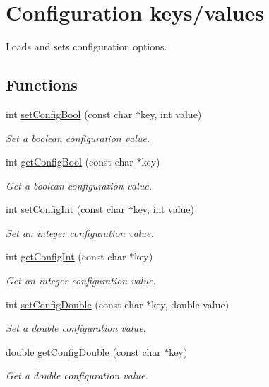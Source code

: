 \hypertarget{group__config}{\section{Configuration keys/values}
\label{group__config}
}


Loads and sets configuration options.  


\subsection*{Functions}
\begin{DoxyCompactItemize}
\item 
int \hyperlink{group__config_gae778c76310afed5f769e44bd181e5f4a}{set\+Config\+Bool} (const char $\ast$key, int value)
\begin{DoxyCompactList}\small\item\em Set a boolean configuration value. \end{DoxyCompactList}\item 
int \hyperlink{group__config_ga22a14b4d4a38b8f70b181600eea85afb}{get\+Config\+Bool} (const char $\ast$key)
\begin{DoxyCompactList}\small\item\em Get a boolean configuration value. \end{DoxyCompactList}\item 
int \hyperlink{group__config_gaa99f01232a745b6b424ac0b7b683bfe3}{set\+Config\+Int} (const char $\ast$key, int value)
\begin{DoxyCompactList}\small\item\em Set an integer configuration value. \end{DoxyCompactList}\item 
int \hyperlink{group__config_ga743f765ab2f01f2200f4e1d6f228fc24}{get\+Config\+Int} (const char $\ast$key)
\begin{DoxyCompactList}\small\item\em Get an integer configuration value. \end{DoxyCompactList}\item 
int \hyperlink{group__config_gafb1fcaaa3158be1cded7a28f3a2e6b74}{set\+Config\+Double} (const char $\ast$key, double value)
\begin{DoxyCompactList}\small\item\em Set a double configuration value. \end{DoxyCompactList}\item 
double \hyperlink{group__config_ga144a5a318ee0d879fa60fc7138b4f349}{get\+Config\+Double} (const char $\ast$key)
\begin{DoxyCompactList}\small\item\em Get a double configuration value. \end{DoxyCompactList}\end{DoxyCompactItemize}


